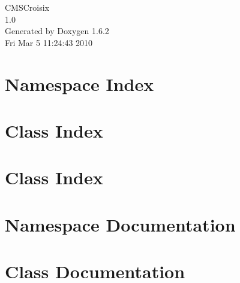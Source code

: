 \documentclass[a4paper]{book}
\begin{document}
\hypersetup{pageanchor=false}
\begin{titlepage}
\vspace*{7cm}
\begin{center}
{\Large CMSCroisix \\[1ex]\large 1.0 }\\
\vspace*{1cm}
{\large Generated by Doxygen 1.6.2}\\
\vspace*{0.5cm}
{\small Fri Mar 5 11:24:43 2010}\\
\end{center}
\end{titlepage}
\clearemptydoublepage
{}
\tableofcontents
\clearemptydoublepage
{}
\hypersetup{pageanchor=true}
\chapter{Namespace Index}

\chapter{Class Index}

\chapter{Class Index}

\chapter{Namespace Documentation}


\chapter{Class Documentation}



























\printindex
\end{document}
